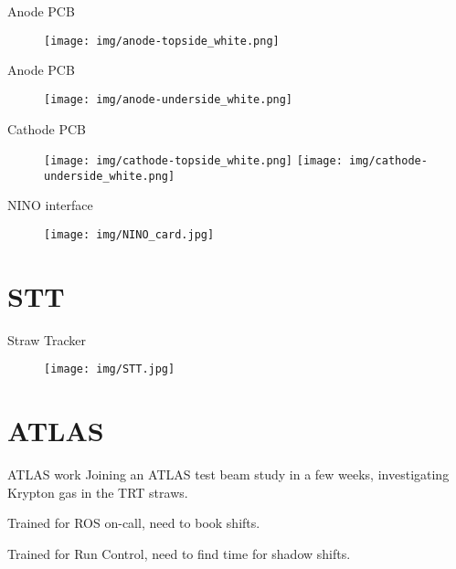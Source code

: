 \documentclass{beamer}
\begin{document}
\begin{frame}{Anode PCB}
  \begin{figure}
    \centering
    \texttt{[image: img/anode-topside\_white.png]}
  \end{figure}
\end{frame}

\begin{frame}{Anode PCB}
  \begin{figure}
    \centering
    \texttt{[image: img/anode-underside\_white.png]}
  \end{figure}
\end{frame}

\begin{frame}{Cathode PCB}
  \begin{figure}
    \centering
    \texttt{[image: img/cathode-topside\_white.png]}
    \texttt{[image: img/cathode-underside\_white.png]}
  \end{figure}
\end{frame}

\begin{frame}{NINO interface}
  \begin{figure}
    \centering
    \texttt{[image: img/NINO\_card.jpg]}
  \end{figure}
\end{frame}

\section[]{STT}
\begin{frame}{Straw Tracker}
  \begin{figure}
    \centering
    \texttt{[image: img/STT.jpg]}
  \end{figure}
\end{frame}

\section{ATLAS}
\begin{frame}{ATLAS work}
Joining an ATLAS test beam study in a few weeks, investigating Krypton gas in the TRT straws.

Trained for ROS on-call, need to book shifts.

Trained for Run Control, need to find time for shadow shifts.

\end{frame}
\end{document}
